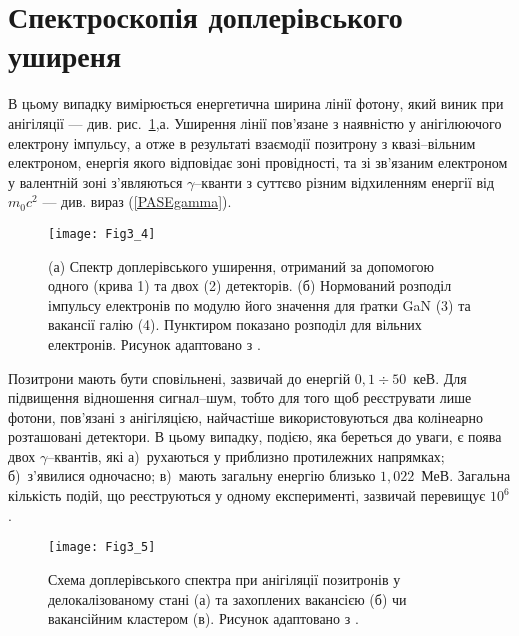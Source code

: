 \section{Спектроскопія доплерівського уширеня}\label{secPAS_SDU}

В цьому випадку вимірюється енергетична ширина лінії фотону,
який виник при анігіляції --- див. рис.~\ref{F34},а.
Уширення лінії пов'язане з наявністю у анігілюючого електрону імпульсу,
а отже в результаті взаємодії позитрону з квазі--вільним електроном, енергія якого відповідає
зоні провідності, та зі зв'язаним електроном у валентній зоні
з'являються $\gamma$--кванти з суттєво різним відхиленням енергії від $m_0c^2$
--- див. вираз (\ref{PASEgamma}).

\begin{figure}[!t]
\center
\vspace{-5mm}
\texttt{[image: Fig3\_4]}
\vspace{-3mm}
\caption{(а) Спектр доплерівського уширення,
отриманий за допомогою одного (крива 1) та двох (2)
детекторів.
(б) Нормований розподіл імпульсу електронів
по модулю його значення для ґратки GaN (3)
та вакансії галію (4).
Пунктиром показано розподіл для вільних електронів.
Рисунок адаптовано з \cite{PAS}.
}
\vspace{-3mm}
\label{F34}
\end{figure}

Позитрони мають бути сповільнені, зазвичай до енергій $0,1\div50$~кеВ.
Для підвищення відношення сигнал--шум, тобто для того щоб реєструвати лише фотони, пов'язані з анігіляцією,
найчастіше використовуються два колінеарно розташовані детектори.
В цьому випадку, подією, яка береться до уваги, є поява двох $\gamma$--квантів, які
а)~рухаються у приблизно протилежних напрямках;
б)~з'явилися одночасно;
в)~мають загальну енергію близько $1,022$~МеВ.
Загальна кількість подій, що реєструються у одному експерименті,
зазвичай перевищує $10^6$.

\begin{figure}[!b]
\center
\vspace{-5mm}
\texttt{[image: Fig3\_5]}
\vspace{-3mm}
\caption{Схема доплерівського спектра при анігіляції
позитронів у делокалізованому стані (а) та захоплених вакансією (б) чи вакансійним кластером (в).
Рисунок адаптовано з \cite{Uedono_2014}.
}
\vspace{-3mm}
\label{F35}
\end{figure}

